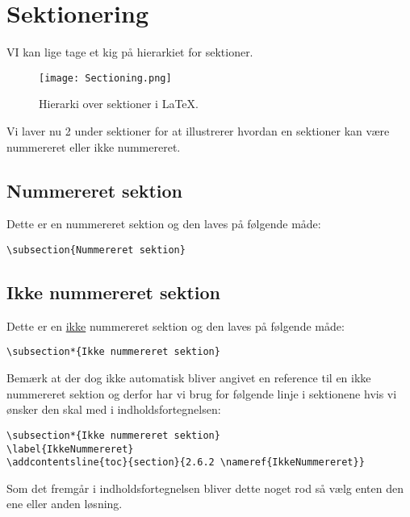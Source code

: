 \documentclass[class=report, crop=false]{standalone}
\begin{document}
    \section{Sektionering}
    VI kan lige tage et kig på hierarkiet for sektioner.
    \begin{figure}[H]
        \centering
            \texttt{[image: Sectioning.png]}
            \caption{Hierarki over sektioner i \LaTeX.}
            \label{fig:Hierarki}
    \end{figure}
    \noindent Vi laver nu 2 under sektioner for at illustrerer hvordan en sektioner kan være nummereret eller ikke nummereret.

    \subsection{Nummereret sektion}
    Dette er en nummereret sektion og den laves på følgende måde:
    \begin{tcolorbox}
        \verb|\subsection{Nummereret sektion}|
    \end{tcolorbox}

    \subsection*{Ikke nummereret sektion}
    \label{IkkeNummereret}
    Dette er en \underline{ikke} nummereret sektion og den laves på følgende måde:
    \begin{tcolorbox}
        \verb|\subsection*{Ikke nummereret sektion}|
    \end{tcolorbox}
    \noindent Bemærk at der dog ikke automatisk bliver angivet en reference til en ikke nummereret sektion og derfor har vi brug for følgende linje i sektionene hvis vi ønsker den skal med i indholdsfortegnelsen:
    \begin{tcolorbox}
        \verb|\subsection*{Ikke nummereret sektion}|\\
        \verb|\label{IkkeNummereret}|\\
        \verb|\addcontentsline{toc}{section}{2.6.2 \nameref{IkkeNummereret}}|
    \end{tcolorbox}
    \noindent Som det fremgår i indholdsfortegnelsen bliver dette noget rod så vælg enten den ene eller anden løsning.
\end{document}
